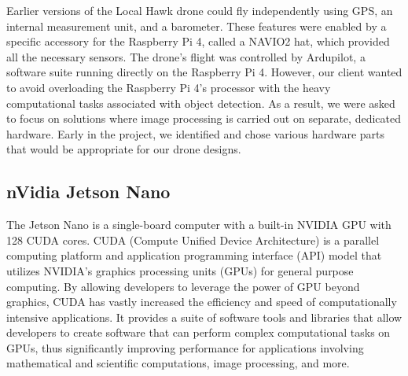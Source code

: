 Earlier versions of the Local Hawk drone could fly independently using GPS, an internal measurement unit, and a barometer. These features were enabled by a specific accessory for the Raspberry Pi 4, called a NAVIO2 hat, which provided all the necessary sensors. The drone's flight was controlled by Ardupilot, a software suite running directly on the Raspberry Pi 4. However, our client wanted to avoid overloading the Raspberry Pi 4's processor with the heavy computational tasks associated with object detection. As a result, we were asked to focus on solutions where image processing is carried out on separate, dedicated hardware. Early in the project, we identified and chose various hardware parts that would be appropriate for our drone designs.\\


\subsection{nVidia Jetson Nano}
The Jetson Nano is a single-board computer with a built-in NVIDIA GPU with 128 CUDA cores.
CUDA (Compute Unified Device Architecture) is a parallel computing platform and application programming interface (API) model that utilizes NVIDIA's graphics processing units (GPUs) for general purpose computing. By allowing developers to leverage the power of GPU beyond graphics, CUDA has vastly increased the efficiency and speed of computationally intensive applications. It provides a suite of software tools and libraries that allow developers to create software that can perform complex computational tasks on GPUs, thus significantly improving performance for applications involving mathematical and scientific computations, image processing, and more.\\

